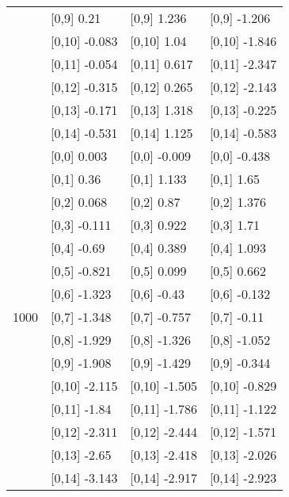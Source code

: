 \begin{table}
\begin{tabular}[t]{llll}
 & {}[0,9] 0.21 & {}[0,9] 1.236 & {}[0,9] -1.206\\
\addlinespace
 & {}[0,10] -0.083 & {}[0,10] 1.04 & {}[0,10] -1.846\\
 & {}[0,11] -0.054 & {}[0,11] 0.617 & {}[0,11] -2.347\\
 & {}[0,12] -0.315 & {}[0,12] 0.265 & {}[0,12] -2.143\\
 & {}[0,13] -0.171 & {}[0,13] 1.318 & {}[0,13] -0.225\\
 & {}[0,14] -0.531 & {}[0,14] 1.125 & {}[0,14] -0.583\\
\addlinespace
 & {}[0,0] 0.003 & {}[0,0] -0.009 & {}[0,0] -0.438\\
 & {}[0,1] 0.36 & {}[0,1] 1.133 & {}[0,1] 1.65\\
 & {}[0,2] 0.068 & {}[0,2] 0.87 & {}[0,2] 1.376\\
 & {}[0,3] -0.111 & {}[0,3] 0.922 & {}[0,3] 1.71\\
 & {}[0,4] -0.69 & {}[0,4] 0.389 & {}[0,4] 1.093\\
\addlinespace
 & {}[0,5] -0.821 & {}[0,5] 0.099 & {}[0,5] 0.662\\
 & {}[0,6] -1.323 & {}[0,6] -0.43 & {}[0,6] -0.132\\
1000 & {}[0,7] -1.348 & {}[0,7] -0.757 & {}[0,7] -0.11\\
 & {}[0,8] -1.929 & {}[0,8] -1.326 & {}[0,8] -1.052\\
 & {}[0,9] -1.908 & {}[0,9] -1.429 & {}[0,9] -0.344\\
\addlinespace
 & {}[0,10] -2.115 & {}[0,10] -1.505 & {}[0,10] -0.829\\
 & {}[0,11] -1.84 & {}[0,11] -1.786 & {}[0,11] -1.122\\
 & {}[0,12] -2.311 & {}[0,12] -2.444 & {}[0,12] -1.571\\
 & {}[0,13] -2.65 & {}[0,13] -2.418 & {}[0,13] -2.026\\
 & {}[0,14] -3.143 & {}[0,14] -2.917 & {}[0,14] -2.923\\
\bottomrule
\end{tabular}
\end{table}
